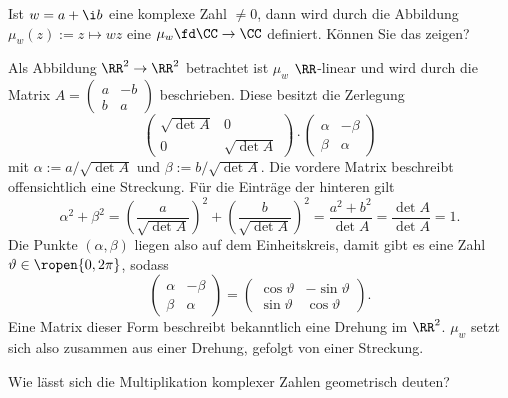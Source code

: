 \begin{frage}
  Ist $w=a+\i b$ eine komplexe Zahl $\not=0$, dann wird durch die  
  Abbildung $\mu_w(z):=z\mapsto wz$ 
  eine  $\mu_w\fd\CC \to \CC$   
  definiert. Können Sie das zeigen?
\end{frage}

\begin{antwort}
  Als Abbildung $\RR^2 \to \RR^2$ betrachtet ist $\mu_w$ $\RR$-linear und wird 
  durch die Matrix $
  A =  \left( \begin{smallmatrix} a &  -b \\ b & a \end{smallmatrix} \right)$ 
  beschrieben. Diese besitzt die Zerlegung 
  \[
  \begin{pmatrix} 
    \sqrt{\det A}  &  0 \\
    0 & \sqrt{\det A} 
  \end{pmatrix}
  \cdot 
  \begin{pmatrix}
    \alpha & -\beta \\
    \beta &  \alpha
  \end{pmatrix}
  \]
  mit $\alpha:=a/\sqrt{\det A}$ und $\beta:= b/\sqrt{\det A}$. 
  Die vordere Matrix beschreibt offensichtlich eine Streckung. 
  Für die Einträge der hinteren gilt 
  \[
  \alpha^2 + \beta^2 = 
  \left(\frac{a}{\sqrt{\det A}}\right)^2 + 
  \left(\frac{b}{\sqrt{\det A}}\right)^2 = \frac{a^2+b^2}{\det A} = 
  \frac{\det A}{\det A} =1.
  \]
  Die Punkte $(\alpha,\beta)$ liegen also auf dem Einheitskreis, 
  damit gibt es eine Zahl $\vartheta\in\ropen{0,2\pi}$, sodass 
  \[
  \begin{pmatrix}
    \alpha & -\beta \\
    \beta & \alpha 
  \end{pmatrix} = 
  \begin{pmatrix} 
    \cos \vartheta & -\sin\vartheta \\
    \sin\vartheta & \cos \vartheta
  \end{pmatrix}.
  \]
  Eine Matrix dieser Form beschreibt bekanntlich eine Drehung im $\RR^2$. 
  $\mu_w$ setzt sich also zusammen aus einer Drehung, gefolgt von einer 
  Streckung. 
  \AntEnd
\end{antwort}






\begin{frage}
  Wie lässt sich die Multiplikation komplexer Zahlen geometrisch deuten?
\end{frage}


